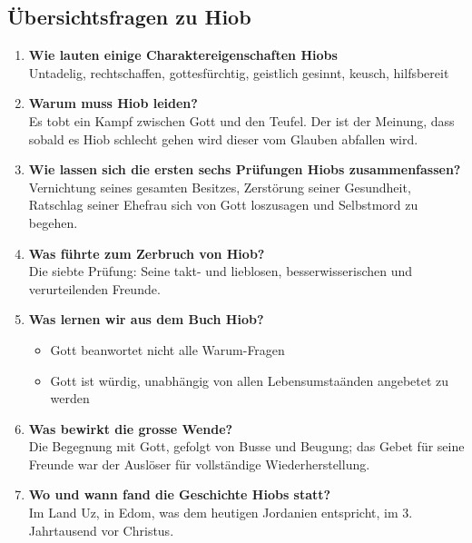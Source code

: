 \subsection{Übersichtsfragen zu Hiob}
\begin{enumerate}
    \item \textbf{Wie lauten einige Charaktereigenschaften Hiobs}\\
    Untadelig, rechtschaffen, gottesfürchtig, geistlich gesinnt, keusch, hilfsbereit
    \item \textbf{Warum muss Hiob leiden?}\\
    Es tobt ein Kampf zwischen Gott und den Teufel. Der ist der Meinung, dass sobald es Hiob schlecht gehen wird dieser vom Glauben abfallen wird.
    \item \textbf{Wie lassen sich die ersten sechs Prüfungen Hiobs zusammenfassen?}\\
    Vernichtung seines gesamten Besitzes, Zerstörung seiner Gesundheit, Ratschlag seiner Ehefrau sich von Gott loszusagen und Selbstmord zu begehen.
     \item \textbf{Was führte zum Zerbruch von Hiob?}\\
     Die siebte Prüfung: Seine takt- und lieblosen, besserwisserischen und verurteilenden Freunde.
     \item \textbf{Was lernen wir aus dem Buch Hiob?}\\
     \begin{itemize}
     		\item Gott beanwortet nicht alle \flqq Warum-Fragen \frqq
     		\item Gott ist würdig, unabhängig von allen Lebensumstaänden angebetet zu werden
     \end{itemize}
     \item \textbf{Was bewirkt die grosse Wende?}\\
     Die Begegnung mit Gott, gefolgt von Busse und Beugung; das Gebet für seine Freunde war der Auslöser für vollständige Wiederherstellung.
     \item \textbf{Wo und wann fand die Geschichte Hiobs statt?}\\
     Im Land Uz, in Edom, was dem heutigen Jordanien entspricht, im 3. Jahrtausend vor Christus.
     
\end{enumerate}